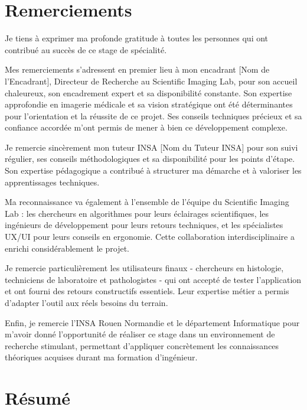 \documentclass[12pt,a4paper]{article}
\begin{document}
\newpage
\thispagestyle{empty}
\mbox{}

\newpage
\section*{Remerciements}

Je tiens à exprimer ma profonde gratitude à toutes les personnes qui ont contribué au succès de ce stage de spécialité.

Mes remerciements s'adressent en premier lieu à mon encadrant [Nom de l'Encadrant], Directeur de Recherche au Scientific Imaging Lab, pour son accueil chaleureux, son encadrement expert et sa disponibilité constante. Son expertise approfondie en imagerie médicale et sa vision stratégique ont été déterminantes pour l'orientation et la réussite de ce projet. Ses conseils techniques précieux et sa confiance accordée m'ont permis de mener à bien ce développement complexe.

Je remercie sincèrement mon tuteur INSA [Nom du Tuteur INSA] pour son suivi régulier, ses conseils méthodologiques et sa disponibilité pour les points d'étape. Son expertise pédagogique a contribué à structurer ma démarche et à valoriser les apprentissages techniques.

Ma reconnaissance va également à l'ensemble de l'équipe du Scientific Imaging Lab : les chercheurs en algorithmes pour leurs éclairages scientifiques, les ingénieurs de développement pour leurs retours techniques, et les spécialistes UX/UI pour leurs conseils en ergonomie. Cette collaboration interdisciplinaire a enrichi considérablement le projet.

Je remercie particulièrement les utilisateurs finaux - chercheurs en histologie, techniciens de laboratoire et pathologistes - qui ont accepté de tester l'application et ont fourni des retours constructifs essentiels. Leur expertise métier a permis d'adapter l'outil aux réels besoins du terrain.

Enfin, je remercie l'INSA Rouen Normandie et le département Informatique pour m'avoir donné l'opportunité de réaliser ce stage dans un environnement de recherche stimulant, permettant d'appliquer concrètement les connaissances théoriques acquises durant ma formation d'ingénieur.

\newpage
\section*{Résumé}
\end{document}
